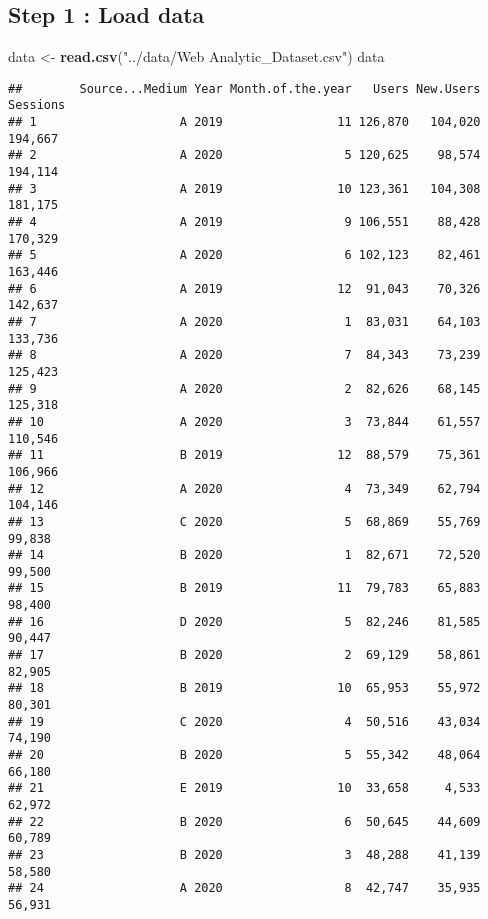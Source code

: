 \documentclass[
]{article}
\newenvironment{Shaded}{\begin{snugshade}}{\end{snugshade}}
\newcommand{\FunctionTok}[1]{\textcolor[rgb]{0.13,0.29,0.53}{\textbf{#1}}}
\newcommand{\NormalTok}[1]{#1}
\newcommand{\OtherTok}[1]{\textcolor[rgb]{0.56,0.35,0.01}{#1}}
\newcommand{\StringTok}[1]{\textcolor[rgb]{0.31,0.60,0.02}{#1}}
\begin{document}
\subsection{Step 1 : Load data}\label{step-1-load-data}

\begin{Shaded}
\begin{Highlighting}[]
\NormalTok{data }\OtherTok{\textless{}{-}} \FunctionTok{read.csv}\NormalTok{(}\StringTok{"../data/Web Analytic\_Dataset.csv"}\NormalTok{)}
\NormalTok{data}
\end{Highlighting}
\end{Shaded}

\begin{verbatim}
##        Source...Medium Year Month.of.the.year   Users New.Users Sessions
## 1                    A 2019                11 126,870   104,020  194,667
## 2                    A 2020                 5 120,625    98,574  194,114
## 3                    A 2019                10 123,361   104,308  181,175
## 4                    A 2019                 9 106,551    88,428  170,329
## 5                    A 2020                 6 102,123    82,461  163,446
## 6                    A 2019                12  91,043    70,326  142,637
## 7                    A 2020                 1  83,031    64,103  133,736
## 8                    A 2020                 7  84,343    73,239  125,423
## 9                    A 2020                 2  82,626    68,145  125,318
## 10                   A 2020                 3  73,844    61,557  110,546
## 11                   B 2019                12  88,579    75,361  106,966
## 12                   A 2020                 4  73,349    62,794  104,146
## 13                   C 2020                 5  68,869    55,769   99,838
## 14                   B 2020                 1  82,671    72,520   99,500
## 15                   B 2019                11  79,783    65,883   98,400
## 16                   D 2020                 5  82,246    81,585   90,447
## 17                   B 2020                 2  69,129    58,861   82,905
## 18                   B 2019                10  65,953    55,972   80,301
## 19                   C 2020                 4  50,516    43,034   74,190
## 20                   B 2020                 5  55,342    48,064   66,180
## 21                   E 2019                10  33,658     4,533   62,972
## 22                   B 2020                 6  50,645    44,609   60,789
## 23                   B 2020                 3  48,288    41,139   58,580
## 24                   A 2020                 8  42,747    35,935   56,931

\end{verbatim}
\end{document}

